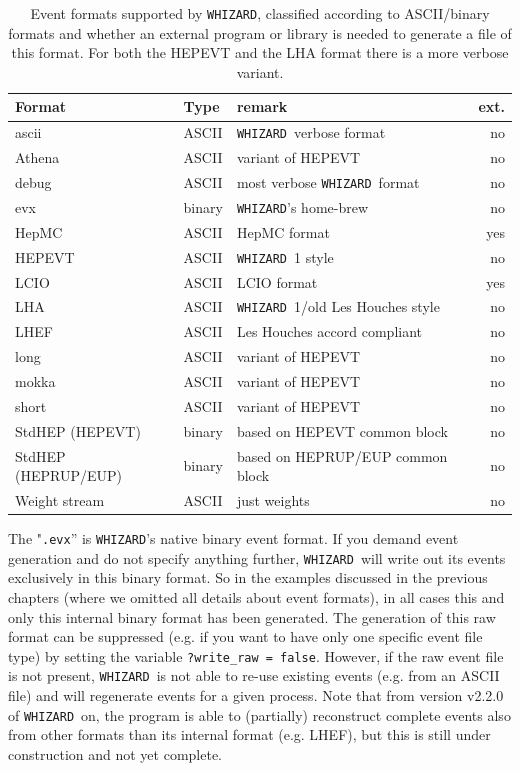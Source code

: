 \documentclass[12pt]{book}
\newcommand{\ttt}[1]{\texttt{#1}}
\newcommand{\whizard}{\ttt{WHIZARD}}
\begin{document}
\begin{table}
  \begin{center}
    \begin{tabular}{|l||l|l|r|}\hline
      Format & Type & remark & ext. \\\hline
      ascii & ASCII & \whizard\ verbose format & no
      \\
      Athena & ASCII & variant of HEPEVT & no
      \\
      debug & ASCII & most verbose \whizard\ format & no
      \\
      evx   & binary & \whizard's home-brew & no
      \\
      HepMC & ASCII & HepMC format & yes
      \\
      HEPEVT & ASCII & \whizard~1 style & no
      \\
      LCIO & ASCII & LCIO format & yes
      \\
      LHA  & ASCII & \whizard~1/old Les Houches style &no
      \\
      LHEF & ASCII & Les Houches accord compliant & no
      \\
      long & ASCII & variant of HEPEVT & no
      \\
      mokka & ASCII & variant of HEPEVT & no
      \\
      short & ASCII & variant of HEPEVT & no
      \\
      StdHEP (HEPEVT) & binary & based on HEPEVT common block  & no
      \\
      StdHEP (HEPRUP/EUP) & binary & based on HEPRUP/EUP common block
      & no \\
      Weight stream & ASCII & just weights & no \\
      \hline
    \end{tabular}
  \end{center}
  \caption{\label{tab:eventformats}
    Event formats supported by \whizard, classified according to
    ASCII/binary formats and whether an external program or library is
    needed to generate a file of this format. For both the HEPEVT and
    the LHA format there is a more verbose variant.
  }
\end{table}
The "\ttt{.evx}'' is \whizard's native binary event format. If you
demand event generation and do not specify anything further, \whizard\
will write out its events exclusively in this binary format. So in the
examples discussed in the previous chapters (where we omitted all
details about event formats), in all cases this and only this internal
binary format has been generated. The generation of this raw format
can be suppressed (e.g. if you want to have only one specific event
file type) by setting the variable \verb|?write_raw = false|. However,
if the raw event file is not present, \whizard\ is not able to re-use
existing events (e.g. from an ASCII file) and will regenerate events
for a given process. Note that from version v2.2.0 of \whizard\ on,
the program is able to (partially) reconstruct complete events also
from other formats than its internal format (e.g. LHEF), but this is
still under construction and not yet complete.
\end{document}
